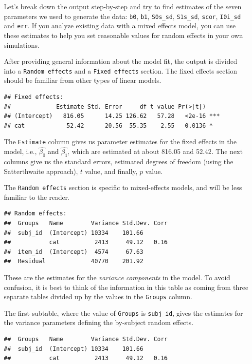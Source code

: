 \documentclass[doc,floatsintext]{apa6}
\begin{document}
\noindent Let's break down the output step-by-step and try to find
estimates of the seven parameters we used to generate the data:
\texttt{b0}, \texttt{b1}, \texttt{S0s\_sd}, \texttt{S1s\_sd},
\texttt{scor}, \texttt{I0i\_sd} and \texttt{err}. If you analyze
existing data with a mixed effects model, you can use these estimates to
help you set reasonable values for random effects in your own
simulations.

After providing general information about the model fit, the output is
divided into a \texttt{Random\ effects} and a \texttt{Fixed\ effects}
section. The fixed effects section should be familiar from other types
of linear models.

\begin{verbatim}
## Fixed effects:
##             Estimate Std. Error     df t value Pr(>|t|)    
## (Intercept)   816.05      14.25 126.62   57.28   <2e-16 ***
## cat            52.42      20.56  55.35    2.55   0.0136 *
\end{verbatim}

\noindent The \texttt{Estimate} column gives us parameter estimates for
the fixed effects in the model, i.e., \(\hat{\beta_0}\) and
\(\hat{\beta_1}\), which are estimated at about 816.05 and 52.42. The
next columns give us the standard errors, estimated degrees of freedom
(using the Satterthwaite approach), \(t\) value, and finally, \(p\)
value.

The \texttt{Random\ effects} section is specific to mixed-effects
models, and will be less familiar to the reader.

\begin{verbatim}
## Random effects:
##  Groups   Name        Variance Std.Dev. Corr
##  subj_id  (Intercept) 10334    101.66       
##           cat          2413     49.12   0.16
##  item_id  (Intercept)  4574     67.63       
##  Residual             40770    201.92
\end{verbatim}

\noindent These are the estimates for the \emph{variance components} in
the model. To avoid confusion, it is best to think of the information in
this table as coming from three separate tables divided up by the values
in the \texttt{Groups} column.

The first subtable, where the value of \texttt{Groups} is
\texttt{subj\_id}, gives the estimates for the variance parameters
defining the by-subject random effects.

\begin{verbatim}
##  Groups   Name        Variance Std.Dev. Corr
##  subj_id  (Intercept) 10334    101.66       
##           cat          2413     49.12   0.16
\end{verbatim}
\end{document}
